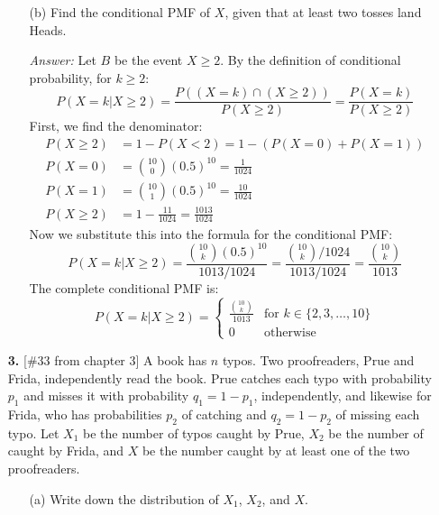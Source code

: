 \documentclass{article}
\begin{document}
\begin{enumerate}
\begin{enumerate}
        \item[(b)] Find the conditional PMF of $X$, given that at least two tosses land Heads.
        
        \medskip
        \noindent \textit{Answer:}
        Let $B$ be the event $X \ge 2$. By the definition of conditional probability, for $k \ge 2$:
        \[
            P(X=k|X\ge2) = \frac{P((X=k) \cap (X \ge 2))}{P(X \ge 2)} = \frac{P(X=k)}{P(X \ge 2)}
        \]
        First, we find the denominator:
        \begin{align*}
            P(X \ge 2) &= 1 - P(X < 2) = 1 - (P(X=0) + P(X=1)) \\
            P(X=0) &= \binom{10}{0}(0.5)^{10} = \frac{1}{1024} \\
            P(X=1) &= \binom{10}{1}(0.5)^{10} = \frac{10}{1024} \\
            P(X \ge 2) &= 1 - \frac{11}{1024} = \frac{1013}{1024}
        \end{align*}
        Now we substitute this into the formula for the conditional PMF:
        \[
             P(X=k|X\ge2) = \frac{\binom{10}{k}(0.5)^{10}}{1013/1024} = \frac{\binom{10}{k}/1024}{1013/1024} = \frac{\binom{10}{k}}{1013}
        \]
        The complete conditional PMF is:
        \[
            P(X=k|X\ge2) = 
            \begin{cases} 
                \frac{\binom{10}{k}}{1013} & \text{for } k \in \{2, 3, \dots, 10\} \\
                0 & \text{otherwise}
            \end{cases}
        \]
    \end{enumerate}

    \item[\textbf{3.}] [\#33 from chapter 3] A book has $n$ typos. Two proofreaders, Prue and Frida, independently read the book. Prue catches each typo with probability $p_{1}$ and misses it with probability $q_{1}=1-p_{1}$, independently, and likewise for Frida, who has probabilities $p_{2}$ of catching and $q_{2}=1-p_{2}$ of missing each typo. Let $X_{1}$ be the number of typos caught by Prue, $X_{2}$ be the number of caught by Frida, and $X$ be the number caught by at least one of the two proofreaders.
    \begin{enumerate}
        \item[(a)] Write down the distribution of $X_{1}$, $X_{2}$, and $X$.
        

\end{enumerate}
\end{enumerate}
\end{document}
